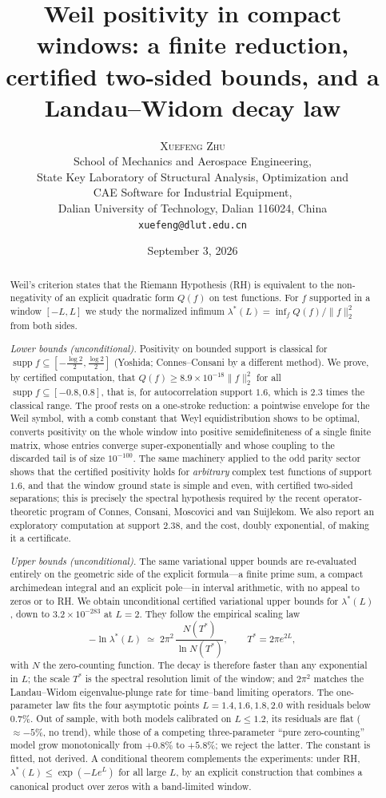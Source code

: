 ﻿\documentclass[11pt]{article}
\title{Weil positivity in compact windows: a finite reduction,\\
certified two-sided bounds, and a Landau--Widom decay law}
\author{%
  \textsc{Xuefeng Zhu}\\[0.6em]
  \normalsize
  School of Mechanics and Aerospace Engineering,\\
  State Key Laboratory of Structural Analysis, Optimization and\\
  CAE Software for Industrial Equipment,\\
  Dalian University of Technology, Dalian 116024, China\\[0.4em]
  \texttt{xuefeng@dlut.edu.cn}%
}
\date{September 3, 2026}
\newcommand{\supp}{\operatorname{supp}}
\newcommand{\lmin}{\lambda^{*}}
\newcommand{\Tstar}{T^{*}}
\begin{document}
\maketitle

\begin{abstract}
Weil's criterion states that the Riemann Hypothesis (RH) is equivalent
to the non-negativity of an explicit quadratic form $Q(f)$ on test
functions.  For $f$ supported in a window $[-L,L]$ we study the
normalized infimum $\lmin(L)=\inf_f Q(f)/\|f\|_2^2$ from both sides.

\emph{Lower bounds (unconditional).}  Positivity on bounded support is
classical for $\supp f\subseteq[-\frac{\log2}2,\frac{\log2}2]$
(Yoshida; Connes--Consani by a different method).  We prove, by
certified computation, that $Q(f)\ge8.9\times10^{-18}\|f\|_2^2$ for
all $\supp f\subseteq[-0.8,0.8]$, that is, for autocorrelation support
$1.6$, which is $2.3$ times the classical range.  The proof rests on a
one-stroke reduction: a pointwise envelope for the Weil symbol, with a
comb constant that Weyl equidistribution shows to be optimal, converts
positivity on the whole window into positive semidefiniteness of a
single finite matrix, whose entries converge super-exponentially and
whose coupling to the discarded tail is of size $10^{-100}$.  The same
machinery applied to the odd parity sector shows that the certified
positivity holds for \emph{arbitrary} complex test functions of
support $1.6$, and that the window ground state is simple and even,
with certified two-sided separations; this is precisely the spectral
hypothesis required by the recent operator-theoretic program of
Connes, Consani, Moscovici and van Suijlekom.  We also
report an exploratory computation at support $2.38$, and the cost,
doubly exponential, of making it a certificate.

\emph{Upper bounds (unconditional).}  The same variational upper
bounds are re-evaluated entirely on the geometric side of the
explicit formula---a finite prime sum, a compact archimedean
integral and an explicit pole---in interval arithmetic, with no
appeal to zeros or to RH.  We obtain unconditional certified
variational upper bounds for $\lmin(L)$, down to
$3.2\times10^{-283}$ at $L=2$.  They follow the empirical scaling law
\[
  -\ln \lmin(L) \;\simeq\; 2\pi^2\,\frac{N(\Tstar)}{\ln N(\Tstar)},
  \qquad \Tstar = 2\pi e^{2L},
\]
with $N$ the zero-counting function.  The decay is therefore faster
than any exponential in $L$; the scale $\Tstar$ is the spectral
resolution limit of the window; and $2\pi^2$ matches the Landau--Widom
eigenvalue-plunge rate for time--band limiting operators.  The
one-parameter law fits the four asymptotic points $L=1.4,1.6,1.8,2.0$
with residuals below $0.7\%$.  Out of sample, with both models
calibrated on $L\le1.2$, its residuals are flat ($\approx-5\%$, no
trend), while those of a competing three-parameter ``pure
zero-counting'' model grow monotonically from $+0.8\%$ to $+5.8\%$;
we reject the latter.  The constant is fitted, not derived.  A
conditional theorem complements the
experiments: under RH, $\lmin(L)\le\exp(-Le^L)$ for all large $L$, by
an explicit construction that combines a canonical product over zeros
with a band-limited window.


\end{abstract}
\end{document}
